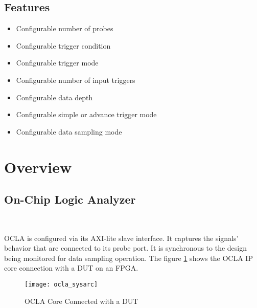 \documentclass[phv, 11pt ]{SelfArx} %
\begin{document}
{	\subsection*{\fontsize{14}{16}\selectfont  Features}
	\begin{itemize}[noitemsep]
		\item Configurable number of probes
		\item Configurable trigger condition
		\item Configurable trigger mode
		\item Configurable number of input triggers
		\item Configurable data depth
		\item Configurable simple or advance trigger mode
		\item Configurable data sampling mode
	\end{itemize}



\newpage
\section*{\hfill \fontsize{24}{28} Overview} %

\subsection*{\fontsize{14}{16}\selectfont On-Chip Logic Analyzer}\

OCLA is configured via its AXI-lite slave interface. It captures the signals' behavior that are connected to its probe port. It is synchronous to the design being monitored for data sampling operation.
The figure \ref{fig:ocla_sysarc} shows the OCLA IP core connection with a DUT on an FPGA.
\begin{figure}[h]\centering %
	\texttt{[image: ocla\_sysarc]}
	\caption{ OCLA Core Connected with a DUT}
	\label{fig:ocla_sysarc}
\end{figure}
\newpage
}
\end{document}
